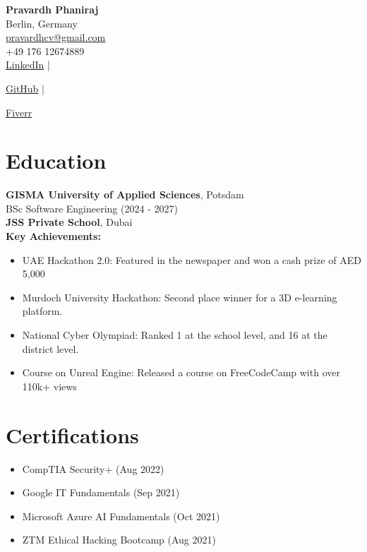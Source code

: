 \documentclass[a4paper,10pt]{article}
\begin{document}
\begin{center}
    
    {\LARGE \textbf{Pravardh Phaniraj}} \\
    Berlin, Germany \\
    
    \href{mailto:pravardhcv@gmail.com}{pravardhcv@gmail.com} \\
    +49 176 12674889 \\
    
    \href{http://www.linkedin.com/in/pravardh}{LinkedIn} |
    
    \href{http://www.github.com/Pravardh}{GitHub} |
    
    \href{http://fiverr.com/pravardhcv}{Fiverr}

\end{center}

\section*{Education}
\textbf{GISMA University of Applied Sciences}, Potsdam \\
BSc Software Engineering (2024 - 2027) \\

\textbf{JSS Private School}, Dubai \\

\textbf{Key Achievements:}
\begin{itemize}

    \item UAE Hackathon 2.0: Featured in the newspaper and won a cash prize of AED 5,000
    \item Murdoch University Hackathon: Second place winner for a 3D e-learning platform.

    \item National Cyber Olympiad: Ranked 1 at the school level, and 16 at the district level.
    \item Course on Unreal Engine: Released a course on FreeCodeCamp with over 110k+ views

\end{itemize}

\section*{Certifications}

\begin{itemize}

    \item CompTIA Security+ (Aug 2022)
    \item Google IT Fundamentals (Sep 2021)
    \item Microsoft Azure AI Fundamentals (Oct 2021)
    \item ZTM Ethical Hacking Bootcamp (Aug 2021)

\end{itemize}
\end{document}
